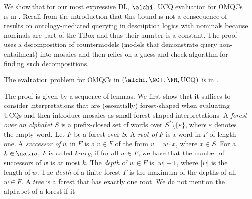 \documentclass{lmcs}
\theoremstyle{definition}
\begin{document}
We show that for our most expressive DL, $\alchi$, UCQ evaluation for OMQCs is in \conp.
Recall from the introduction that this bound is not a consequence of results on ontology-mediated 
querying in description logics with nominals because nominals are part of the TBox and thus their number is a
constant. The proof uses a decomposition of countermodels (models that
demonstrate query non-entailment) into mosaics and then relies on a
guess-and-check algorithm for finding such decompositions.

%
\begin{thm}\label{thm:alchi_closed_datacomplexity}
  The evaluation problem for OMQCs in $(\alchi,\NC \cup 
  \NR,\text{UCQ})$ is in \conp.
\end{thm}
The proof is given by a sequence of lemmas. We first show that it
suffices to consider 
interpretations that are (essentially) forest-shaped 
when evaluating UCQs and then introduce mosaics as small forest-shaped interpretations. 
A \emph{forest over an alphabet} $S$ is a prefix-closed set of words 
over $S^*\setminus\{\varepsilon\}$, where $\varepsilon$ denotes the 
empty word. Let $F$ be a forest over $S$. A \emph{root 
of} $F$ is a word in $F$ of length one.  A \emph{successor of} $w$ in 
$F$ is a $v\in F$ of the form $v=w\cdot x$, where $x\in S$. For a 
$k\in\natno$, $F$ is called \emph{$k$-ary}, if for all $w\in F$, we 
have that the number of successors of $w$ is at most $k$. The \emph{depth} of $w\in F$
is $|w|-1$, where $|w|$ is the length of $w$. The \emph{depth} of
a finite forest $F$ is the maximum of the depths of all $w\in F$. 
A \emph{tree} is a forest that 
has exactly one root. We do not mention the alphabet of a forest if it 
\end{document}
